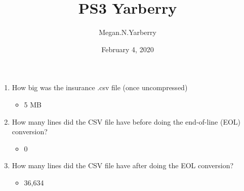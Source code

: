 \documentclass{article}
\title{PS3 Yarberry}
\author{Megan.N.Yarberry }
\date{February 4, 2020}
\begin{document}
\maketitle
\begin{enumerate}
\item How big was the insurance .csv ﬁle (once uncompressed)
	
\begin{itemize}
\item 5 MB
\end{itemize}

\item How many lines did the CSV ﬁle have before doing the end-of-line (EOL) conversion?

\begin{itemize}
\item  0
\end{itemize}

\item How many lines did the CSV ﬁle have after doing the EOL conversion?
 
\begin{itemize}
\item   36,634
\end{itemize}
 
\end{enumerate}
\end{document}
